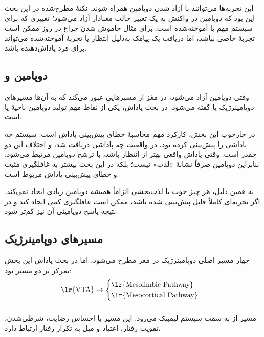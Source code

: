 این تجربه‌ها می‌توانند با آزاد شدن دوپامین همراه شوند. نکتهٔ مطرح‌شده در این بحث این بود که دوپامین در واکنش به یک تغییر حالت معنادار آزاد می‌شود؛ تغییری که برای سیستم مهم یا آموخته‌شده است. برای مثال خاموش شدن چراغ در روز ممکن است تجربهٔ خاصی نباشد، اما دریافت یک پیامک به‌دلیل انتظار یا تجربهٔ آموخته‌شده می‌تواند برای فرد پاداش‌دهنده باشد.

\subsection{دوپامین و }
وقتی دوپامین آزاد می‌شود، در مغز از مسیرهایی عبور می‌کند که به آن‌ها مسیرهای دوپامینرژیک یا  گفته می‌شود. در بحث پاداش، یکی از نقاط مهم تولید دوپامین ناحیهٔ  یا  است.

در چارچوب این بخش، کارکرد مهم  محاسبهٔ خطای پیش‌بینی پاداش است: سیستم چه پاداشی را پیش‌بینی کرده بود، در واقعیت چه پاداشی دریافت شد، و اختلاف این دو چقدر است. وقتی پاداش واقعی بهتر از انتظار باشد،  با ترشح دوپامین مرتبط می‌شود. بنابراین دوپامین صرفاً نشانهٔ «لذت» نیست؛ بلکه در این بحث بیشتر به غافلگیری مثبت و خطای پیش‌بینی پاداش مربوط است.

به همین دلیل، هر چیز خوب یا لذت‌بخشی الزاماً همیشه دوپامین زیادی ایجاد نمی‌کند. اگر تجربه‌ای کاملاً قابل پیش‌بینی شده باشد، ممکن است غافلگیری کمی ایجاد کند و در نتیجه پاسخ دوپامینی آن نیز کم‌تر شود.

\subsection{مسیرهای دوپامینرژیک}
چهار مسیر اصلی دوپامینرژیک در مغز مطرح می‌شود، اما در بحث پاداش این بخش تمرکز بر دو مسیر بود:
\[
\text{\lr{VTA}}\rightarrow
\begin{cases}
\text{\lr{Mesolimbic Pathway}}\\
\text{\lr{Mesocortical Pathway}}
\end{cases}
\]


\subsubsection{}
مسیر  از  به سمت سیستم لیمبیک می‌رود. این مسیر با احساس رضایت، شرطی‌شدن، تقویت رفتار، اعتیاد و میل به تکرار رفتار ارتباط دارد.

